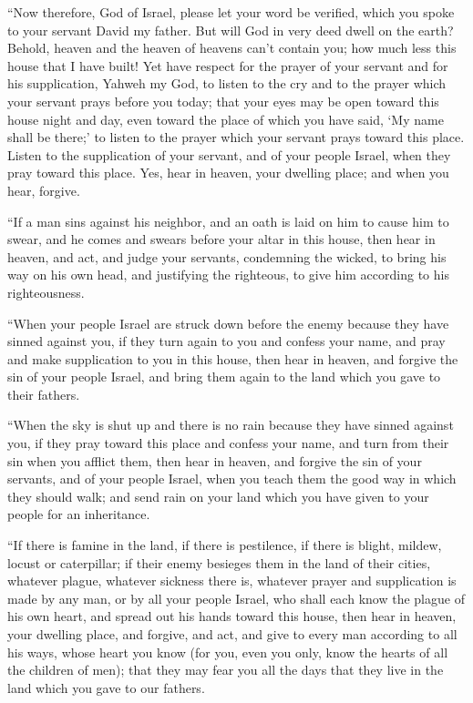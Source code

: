  ``Now therefore, God of Israel, please let your word be
verified, which you spoke to your servant David my father.
 But will God in very deed dwell on the earth? Behold,
heaven and the heaven of heavens can't contain you; how much less this
house that I have built!  Yet have respect for the prayer
of your servant and for his supplication, Yahweh my God, to listen to
the cry and to the prayer which your servant prays before you today;
 that your eyes may be open toward this house night and
day, even toward the place of which you have said, `My name shall be
there;' to listen to the prayer which your servant prays toward this
place.  Listen to the supplication of your servant, and
of your people Israel, when they pray toward this place. Yes, hear in
heaven, your dwelling place; and when you hear, forgive.

 ``If a man sins against his neighbor, and an oath is
laid on him to cause him to swear, and he comes and swears before your
altar in this house,  then hear in heaven, and act, and
judge your servants, condemning the wicked, to bring his way on his own
head, and justifying the righteous, to give him according to his
righteousness.

 ``When your people Israel are struck down before the
enemy because they have sinned against you, if they turn again to you
and confess your name, and pray and make supplication to you in this
house,  then hear in heaven, and forgive the sin of your
people Israel, and bring them again to the land which you gave to their
fathers.

 ``When the sky is shut up and there is no rain because
they have sinned against you, if they pray toward this place and confess
your name, and turn from their sin when you afflict them,
 then hear in heaven, and forgive the sin of your
servants, and of your people Israel, when you teach them the good way in
which they should walk; and send rain on your land which you have given
to your people for an inheritance.

 ``If there is famine in the land, if there is
pestilence, if there is blight, mildew, locust or caterpillar; if their
enemy besieges them in the land of their cities, whatever plague,
whatever sickness there is,  whatever prayer and
supplication is made by any man, or by all your people Israel, who shall
each know the plague of his own heart, and spread out his hands toward
this house,  then hear in heaven, your dwelling place,
and forgive, and act, and give to every man according to all his ways,
whose heart you know (for you, even you only, know the hearts of all the
children of men);  that they may fear you all the days
that they live in the land which you gave to our fathers.

